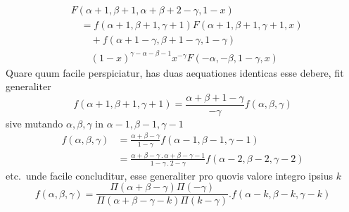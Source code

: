 \[
\begin{aligned}
&F(\alpha+1,\beta+1,\alpha+\beta+2-\gamma,1-x)\\
&\quad=f(\alpha+1,\beta+1,\gamma+1)F(\alpha+1,\beta+1,\gamma+1,x)\\
&\qquad+f(\alpha+1-\gamma,\beta+1-\gamma,1-\gamma)\\&\qquad(1-x)^{\gamma-\alpha-\beta-1}x^{-\gamma}F(-\alpha,-\beta,1-\gamma,x)
\end{aligned}
\]
Quare quum facile perspiciatur, has duas aequationes identicas esse debere, fit generaliter
\[
f(\alpha+1,\beta+1,\gamma+1)=\frac{\alpha+\beta+1-\gamma}{-\gamma}f(\alpha,\beta,\gamma)
\]
sive mutando \(\alpha,\beta,\gamma\) in \(\alpha-1,\beta-1,\gamma-1\)
\[
\begin{aligned}
f(\alpha,\beta,\gamma)&=\frac{\alpha+\beta-\gamma}{1-\gamma}f(\alpha-1,\beta-1,\gamma-1)\\
&=\frac{\alpha+\beta-\gamma\,.\,\alpha+\beta-\gamma-1}{1-\gamma\,.\,2-\gamma}f(\alpha-2,\beta-2,\gamma-2)
\end{aligned}
\]
etc.\ unde facile concluditur, esse generaliter pro quovis valore integro ipsius \(k\)
\[
f(\alpha,\beta,\gamma)=\frac{\Pi(\alpha+\beta-\gamma)\Pi(-\gamma)}{\Pi(\alpha+\beta-\gamma-k)\Pi(k-\gamma)}.f(\alpha-k,\beta-k,\gamma-k)
\]
